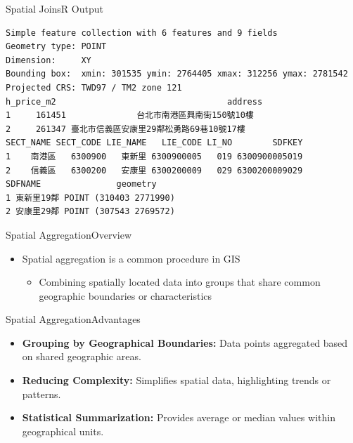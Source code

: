 \documentclass[dvipsnames,hyperref={pdfpagelabels=false}]{beamer}
\begin{document}
\begin{frame}[fragile]{Spatial Joins}{R Output}
	
	\tiny
	
\begin{lstlisting}
Simple feature collection with 6 features and 9 fields
Geometry type: POINT
Dimension:     XY
Bounding box:  xmin: 301535 ymin: 2764405 xmax: 312256 ymax: 2781542
Projected CRS: TWD97 / TM2 zone 121
h_price_m2                                  address
1     161451              台北市南港區興南街150號10樓
2     261347 臺北市信義區安康里29鄰松勇路69巷10號17樓
SECT_NAME SECT_CODE LIE_NAME   LIE_CODE LI_NO        SDFKEY
1    南港區   6300900   東新里 6300900005   019 6300900005019
2    信義區   6300200   安康里 6300200009   029 6300200009029
SDFNAME               geometry
1 東新里19鄰 POINT (310403 2771990)
2 安康里29鄰 POINT (307543 2769572)
\end{lstlisting}
	
\end{frame}








\begin{frame}{Spatial Aggregation}{Overview}
	
	\begin{itemize}
		\item Spatial aggregation is a common procedure in GIS
					\vspace{0.2cm}
			\begin{itemize}
		 \item Combining spatially located data into groups that share common geographic boundaries or characteristics
		 
		 	\end{itemize}
	
	\end{itemize}
\end{frame}

\begin{frame}{Spatial Aggregation}{Advantages}
	
	\begin{itemize}
		\item \textbf{Grouping by Geographical Boundaries:} Data points aggregated based on shared geographic areas.
							\vspace{0.2cm}
		\item \textbf{Reducing Complexity:} Simplifies spatial data, highlighting trends or patterns.
							\vspace{0.2cm}
		\item \textbf{Statistical Summarization:} Provides average or median values within geographical units.
	\end{itemize}
\end{frame}
\end{document}
